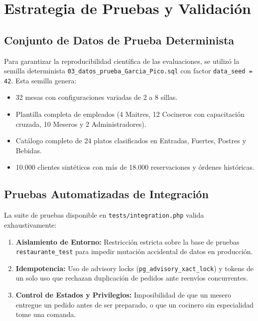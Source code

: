 \documentclass[11pt,letterpaper]{article}
\begin{document}
\newpage
\section{Estrategia de Pruebas y Validación}

\subsection{Conjunto de Datos de Prueba Determinista}
Para garantizar la reproducibilidad científica de las evaluaciones, se utilizó la semilla determinista \texttt{03\_datos\_prueba\_Garcia\_Pico.sql} con factor \texttt{data\_seed = 42}. Esta semilla genera:
\begin{itemize}
    \item 32 mesas con configuraciones variadas de 2 a 8 sillas.
    \item Plantilla completa de empleados (4 Maitres, 12 Cocineros con capacitación cruzada, 10 Meseros y 2 Administradores).
    \item Catálogo completo de 24 platos clasificados en Entradas, Fuertes, Postres y Bebidas.
    \item 10.000 clientes sintéticos con más de 18.000 reservaciones y órdenes históricas.
\end{itemize}

\subsection{Pruebas Automatizadas de Integración}
La suite de pruebas disponible en \texttt{tests/integration.php} valida exhaustivamente:
\begin{enumerate}
    \item \textbf{Aislamiento de Entorno:} Restricción estricta sobre la base de pruebas \texttt{restaurante\_test} para impedir mutación accidental de datos en producción.
    \item \textbf{Idempotencia:} Uso de advisory locks (\texttt{pg\_advisory\_xact\_lock}) y tokens de un solo uso que rechazan duplicación de pedidos ante reenvíos concurrentes.
    \item \textbf{Control de Estados y Privilegios:} Imposibilidad de que un mesero entregue un pedido antes de ser preparado, o que un cocinero sin especialidad tome una comanda.
\end{enumerate}
\end{document}
